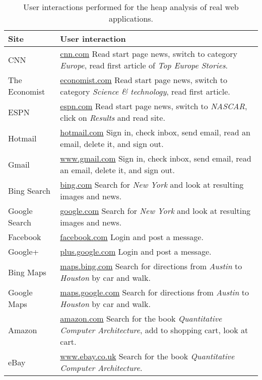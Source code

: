 \begin{table}
	\small
	\centering
	\begin{tabular}{p{2cm} p{5cm}}
		\toprule
		\textbf{Site} & \textbf{User interaction} \\ \midrule
		CNN & \url{cnn.com}
		Read start page news, switch to category \textit{Europe}, 		 
		  read first article of \textit{Top Europe Stories}. \\ \midrule

		The Economist & \url{economist.com}
		Read start page news, switch to category 			
		  \textit{Science \& technology}, read first article. \\ \midrule

		ESPN & \url{espn.com}
		Read start page news, switch to \textit{NASCAR},  
		  click on \textit{Results} and read site. \\ \midrule

		Hotmail & \url{hotmail.com}
		Sign in, check inbox, send email, read an email,
		  delete it, and sign out. \\ \midrule

		Gmail & \url{www.gmail.com}
		Sign in, check inbox, send email, read an email, 	
		  delete it, and sign out. \\ \midrule

		Bing Search & \url{bing.com} 
		Search for \textit{New York} and look at 
		  resulting images and news. \\ \midrule

		Google Search & \url{google.com}
		Search for \textit{New York} and look at 			
		  resulting images and news. \\ \midrule

		Facebook & \url{facebook.com} 
		Login and post a message.  \\ \midrule

		Google+ & \url{plus.google.com}
		Login and post a message. \\ \midrule

		Bing Maps & \url{maps.bing.com}
		Search for directions from \textit{Austin} to \textit{Houston} 
		  by car and walk. \\ \midrule

		Google Maps	& \url{maps.google.com}
		Search for directions from \textit{Austin} to \textit{Houston} 
		  by car and walk. \\ \midrule

		Amazon & \url{amazon.com} 
		Search for the book \textit{Quantitative Computer Architecture},
		  add to shopping cart, look at cart. \\ \midrule

		eBay & \url{www.ebay.co.uk}					
		Search for the book \textit{Quantitative Computer Architecture}. 			\\  \bottomrule

	\end{tabular}
	\caption{User interactions performed for the heap analysis of real web applications.}
	\label{tab:real_world_apps}
\end{table}


